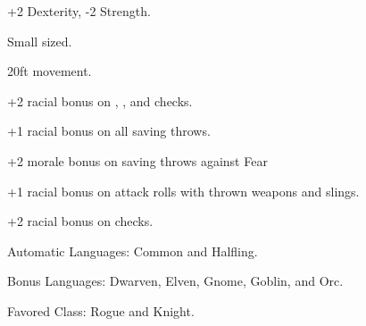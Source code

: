 

\begin{itemize*}
\item +2 Dexterity, -2 Strength.
\item Small sized.
\item 20ft movement.
\item +2 racial bonus on , , and  checks.
\item +1 racial bonus on all saving throws.
\item +2 morale bonus on saving throws against Fear
\item +1 racial bonus on attack rolls with thrown weapons and slings.
\item +2 racial bonus on  checks.
\item Automatic Languages: Common and Halfling.
\item Bonus Languages: Dwarven, Elven, Gnome, Goblin, and Orc.
\item Favored Class: Rogue and Knight.
\end{itemize*}
